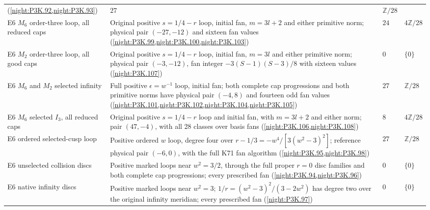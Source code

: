 \begin{longtable}{@{}p{.23\linewidth}p{.37\linewidth}p{.16\linewidth}p{.17\linewidth}@{}}
  (\cref{night:P3K.92,night:P3K.93})
  & $27$ & $\mathbb Z/28$\\
E6 $M_6$ order-three loop, all reduced caps & Original positive
  $s=1/4-r$ loop, initial fan, $m=3l+2$ and either primitive norm;
  physical pair $(-27,-12)$ and sixteen fan values
  (\cref{night:P3K.99,night:P3K.100,night:P3K.103})
  & $24$ & $4\mathbb Z/28$\\
E6 $M_2$ order-three loop, all good caps & Original positive
  $s=1/4-r$ loop, initial fan, $m=3l$ and either primitive norm;
  physical pair $(-3,-12)$, fan integer $-3(S-1)(S-3)/8$
  with sixteen values (\cref{night:P3K.107})
  & $0$ & $\{0\}$\\
E6 $M_6$ and $M_2$ selected infinity & Full positive
  $\epsilon=w^{-1}$ loop, initial fan; both complete cap
  progressions and both primitive norms have physical pair
  $(-4,8)$ and fourteen odd fan values
  (\cref{night:P3K.101,night:P3K.102,night:P3K.104,night:P3K.105})
  & $27$ & $\mathbb Z/28$\\
E6 $M_6$ selected $I_3$, all reduced caps & Original positive
  $s=1/4-r$ loop and initial fan, with $m=3l+2$ and either norm;
  pair $(47,-4)$, with all 28 classes over basis fans
  (\cref{night:P3K.106,night:P3K.108})
  & $8$ & $4\mathbb Z/28$\\
E6 ordered selected-cusp loop & Positive ordered $w$ loop,
  degree four over $r-1/3=-w^4/[3(w^2-3)^2]$; reference
  physical pair $(-6,0)$, with the full K71 fan algorithm
  (\cref{night:P3K.95,night:P3K.98})
  & $27$ & $\mathbb Z/28$\\
E6 unselected collision discs & Positive marked loops near
  $w^2=3/2$, through the full proper $r=0$ disc families and
  both complete cap progressions; every prescribed fan
  (\cref{night:P3K.94,night:P3K.96})
  & $0$ & $\{0\}$\\
E6 native infinity discs & Positive marked loops near $w^2=3$;
  $1/r=(w^2-3)^2/(3-2w^2)$ has degree two over the original
  infinity meridian; every prescribed fan
  (\cref{night:P3K.97})
  & $0$ & $\{0\}$\\
\end{longtable}
\endgroup



